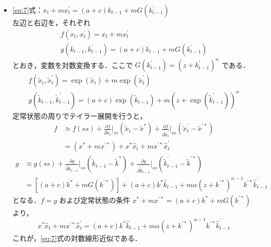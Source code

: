 \documentclass[dvipdfmx]{jlreq}
\begin{document}
\begin{itemize}
  \item \eqref{eq:7}式：$x_t + m x^\prime_t = (a + c) k_{t-1} + m G(k^\prime_{t-1})$ \\
    左辺と右辺を，それぞれ
    \begin{gather}
      f(x_t, x^\prime_t) = x_t + m x^\prime_t \\
      g(k_{t-1}, k^\prime_{t-1}) = (a + c) k_{t-1} + m G(k^\prime_{t-1})
    \end{gather}
    とおき，変数を対数変換する．ここで $G(k^\prime_{t-1}) = (z+k^\prime_{t-1})^\alpha$ である．
    \begin{gather}
      f(\widetilde{x}_t, \widetilde{x}^\prime_t) = \exp(\widetilde{x}_t) + m \exp(\widetilde{x}^\prime_t) \\
      g(\widetilde{k}_{t-1}, \widetilde{k}^\prime_{t-1}) = (a + c) \exp(\widetilde{k}_{t-1}) + m (z+\exp(\widetilde{k}^\prime_{t-1}))^\alpha
    \end{gather}
    定常状態の周りでテイラー展開を行うと，
    \begin{equation}
      \begin{split}
        f &\approx f(ss) + \frac{\partial f}{\partial \widetilde{x}_t} \bigg|_{ss} (\widetilde{x}_t - \widetilde{x}^*) + \frac{\partial f}{\partial \widetilde{x}^\prime_t} \bigg|_{ss} (\widetilde{x}^\prime_t - \widetilde{x}^{\prime *}) \\
        &= (x^* + m x^{\prime *}) + x^* \widehat{x}_t + m x^{\prime *} \widehat{x}^\prime_t
      \end{split}
    \end{equation}
    \begin{equation}
      \begin{split}
        g &\approx g(ss) + \frac{\partial g}{\partial \widetilde{k}_{t-1}} \bigg|_{ss} (\widetilde{k}_{t-1} - \widetilde{k}^*) + \frac{\partial g}{\partial \widetilde{k}^\prime_{t-1}} \bigg|_{ss} (\widetilde{k}^\prime_{t-1} - \widetilde{k}^{\prime *}) \\
        &= [(a+c)k^* + m G(k^{\prime *})] + (a+c)k^* \widehat{k}_{t-1} + m \alpha(z+k^{\prime *})^{\alpha-1} k^{\prime *} \widehat{k}^\prime_{t-1}
      \end{split}
    \end{equation}
    となる．$f=g$ および定常状態の条件 $x^* + m x^{\prime *} = (a+c)k^* + m G(k^{\prime *})$ より，
    \begin{equation}
      x^* \widehat{x}_t + m x^{\prime *} \widehat{x}^\prime_t = (a+c)k^* \widehat{k}_{t-1} + m \alpha(z+k^{\prime *})^{\alpha-1} k^{\prime *} \widehat{k}^\prime_{t-1}
    \end{equation}
    これが，\eqref{eq:7}式の対数線形近似である．


\end{itemize}
\end{document}
